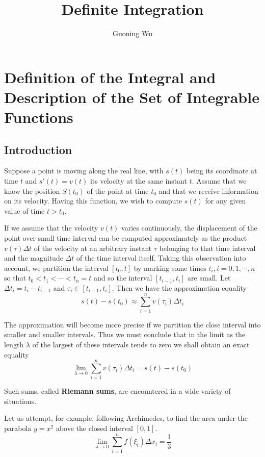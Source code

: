 \documentclass[a4paper,12pt]{article} %
\title{Definite Integration}
\author{Guoning Wu}
\begin{document}
\setcounter{tocdepth}{2}
\maketitle
\theoremstyle{definition}

\section{Definition of the Integral and Description of the 
Set of Integrable Functions}
\subsection{Introduction}

Suppose a point is moving along the real line, with $s(t)$ being 
its coordinate at time $t$ and $s'(t) = v(t)$ its velocity at the 
same instant $t$. Assume that we know the position $S(t_0)$ of the 
point at time $t_0$ and that we receive information on its velocity.
Having this function, we wish to compute $s(t)$ for any given value 
of time $t > t_0$.

If we assume that the velocity $v(t)$ varies continuously, the 
displacement of the point over small time interval can be computed 
approximately as the product $v(\tau)\Delta t$ of the velocity at an arbitrary 
instant $\tau$ belonging to that time interval and the magnitude $\Delta t$
of the time interval itself. Taking this observation into account, 
we partition the interval $[t_0, t]$ by marking some times $t_i, i=0,1,\cdots,n$
so that $t_0 < t_1 < \cdots < t_n = t$ and so the interval $[t_{i-1}, t_i]$ are small.
Let $\Delta t_i = t_i - t_{i-1}$ and $\tau_i \in [t_{i-1},t_i]$. Then we have the approximation 
equality 
\[
    s(t) - s(t_0) \approx \sum_{i=1}^n v(\tau_i)\Delta t_i
    \]

The approximation will become more precise if we partition the close 
interval into smaller and smaller intervals. Thus we must conclude 
that in the limit as the length $\lambda$ of the largest of these intervals
tends to zero we shall obtain an exact equality
\begin{equation}
    \lim_{\lambda \to 0}\sum_{i=1}^nv(\tau_i)\Delta t_i = s(t) - s(t_0)
\end{equation}

Such sums, called \textbf{Riemann sums}, are encountered in a wide variety of 
situations.

Let us attempt, for example, following Archimedes, to find the area 
under the parabola $y = x^2$ above the closed interval $[0,1]$.
\[
    \lim_{\lambda \to 0}\sum_{i=1}^nf(\xi_i)\Delta x_i = \frac{1}{3}
    \]
\end{document}
